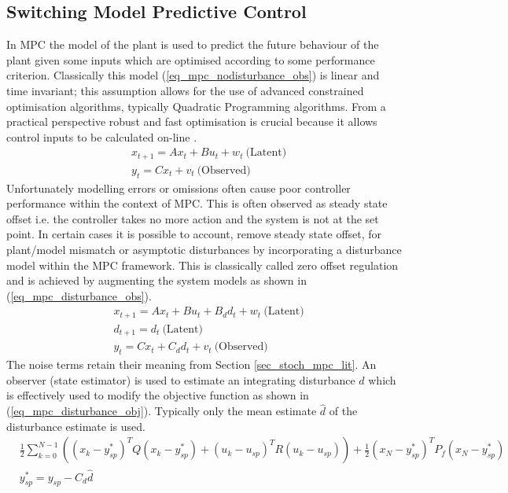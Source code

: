 \subsection{Switching Model Predictive Control}
\label{sec_switch_mpc_lit}
In MPC the model of the plant is used to predict the future behaviour of the plant given some inputs which are optimised according to some performance criterion. Classically this model (\ref{eq_mpc_nodisturbance_obs}) is linear and time invariant; this assumption allows for the use of advanced constrained optimisation algorithms, typically Quadratic Programming algorithms. From a practical perspective robust and fast optimisation is crucial because it allows control inputs to be calculated on-line \cite{mac}.
\begin{equation}
\begin{aligned}
&x_{t+1} = Ax_t + Bu_t + w_t~\text{(Latent)} \\
&y_t = Cx_t + v_t~\text{(Observed)}
\end{aligned}
\label{eq_mpc_nodisturbance_obs}
\end{equation}
Unfortunately modelling errors or omissions often cause poor controller performance within the context of MPC. This is often observed as steady state offset i.e. the controller takes no more action and the system is not at the set point. In certain cases it is possible to account, remove steady state offset, for plant/model mismatch or asymptotic disturbances by incorporating a disturbance model within the MPC framework. This is classically called zero offset regulation \cite{raw} and is achieved by augmenting the system models as shown in (\ref{eq_mpc_disturbance_obs}).
\begin{equation}
\begin{aligned}
&x_{t+1} = Ax_t + Bu_t + B_d d_t + w_t~\text{(Latent)} \\
&d_{t+1} = d_t ~\text{(Latent)}\\
&y_t = Cx_t + C_d d_t + v_t~\text{(Observed)}
\end{aligned}
\label{eq_mpc_disturbance_obs}
\end{equation}
The noise terms retain their meaning from Section \ref{sec_stoch_mpc_lit}. An observer (state estimator) is used to estimate an integrating disturbance $d$ which is effectively used to modify the objective function as shown in (\ref{eq_mpc_disturbance_obj}). Typically only the mean estimate $\hat{d}$ of the disturbance estimate is used.
\begin{equation}
\begin{aligned}
&\frac{1}{2}\sum_{k=0}^{N-1} \left( (x_k-y_{sp}^*)^TQ(x_k-y_{sp}^*) + (u_k-u_{sp})^TR(u_k-u_{sp}) \right) + \frac{1}{2}(x_N-y_{sp}^*)^TP_f(x_N-y_{sp}^*) \\
&y_{sp}^* = y_{sp}-C_d \hat{d}
\end{aligned}
\label{eq_mpc_disturbance_obj}
\end{equation}

